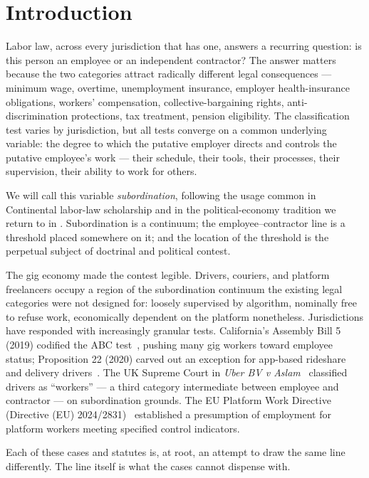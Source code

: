 \documentclass[11pt,a4paper]{article}
\theoremstyle{remark}
\begin{document}
\section{Introduction}
\label{sec:intro}

Labor law, across every jurisdiction that has one, answers a
recurring question: is this person an employee or an independent
contractor? The answer matters because the two categories attract
radically different legal consequences --- minimum wage, overtime,
unemployment insurance, employer health-insurance obligations,
workers' compensation, collective-bargaining rights, anti-discrimination
protections, tax treatment, pension eligibility. The classification
test varies by jurisdiction, but all tests converge on a common
underlying variable: the degree to which the putative employer
directs and controls the putative employee's work --- their
schedule, their tools, their processes, their supervision, their
ability to work for others.

We will call this variable \emph{subordination}, following the
usage common in Continental labor-law scholarship and in the
political-economy tradition we return to in .
Subordination is a continuum; the employee--contractor line is a
threshold placed somewhere on it; and the location of the threshold
is the perpetual subject of doctrinal and political contest.

The gig economy made the contest legible. Drivers, couriers, and
platform freelancers occupy a region of the subordination continuum
the existing legal categories were not designed for: loosely
supervised by algorithm, nominally free to refuse work, economically
dependent on the platform nonetheless. Jurisdictions have responded
with increasingly granular tests. California's Assembly Bill 5
(2019) codified the ABC test~\citep{ab5_2019}, pushing many gig
workers toward employee status; Proposition 22 (2020) carved out an
exception for app-based rideshare and delivery
drivers~\citep{prop22_2020}. The UK Supreme Court in \emph{Uber BV
v Aslam}~\citep{uber_aslam_2021} classified drivers as ``workers''
--- a third category intermediate between employee and contractor
--- on subordination grounds. The EU Platform Work Directive
(Directive (EU) 2024/2831)~\citep{eu_platform_directive_2024}
established a presumption of employment for platform workers
meeting specified control indicators.

Each of these cases and statutes is, at root, an attempt to draw
the same line differently. The line itself is what the cases
cannot dispense with.
\end{document}
